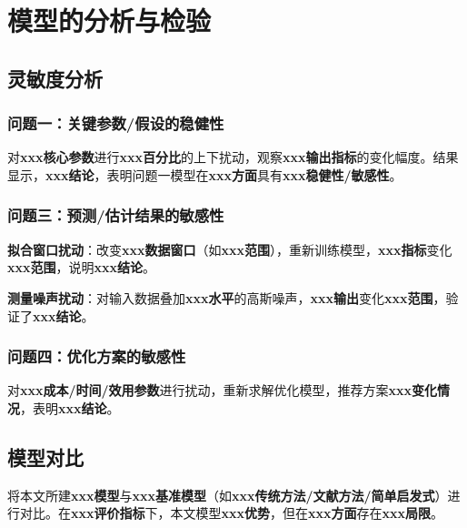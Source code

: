 \documentclass[draft,12pt,a4paper]{ctexart}
\theoremstyle{definition}
\begin{document}
\section{模型的分析与检验}
\subsection{灵敏度分析}

\subsubsection{问题一：关键参数/假设的稳健性}
对\textbf{xxx核心参数}进行\textbf{xxx百分比}的上下扰动，观察\textbf{xxx输出指标}的变化幅度。结果显示，\textbf{xxx结论}，表明问题一模型在\textbf{xxx方面}具有\textbf{xxx稳健性/敏感性}。

\subsubsection{问题三：预测/估计结果的敏感性}
\textbf{拟合窗口扰动}：改变\textbf{xxx数据窗口}（如\textbf{xxx范围}），重新训练模型，\textbf{xxx指标}变化\textbf{xxx范围}，说明\textbf{xxx结论}。

\textbf{测量噪声扰动}：对输入数据叠加\textbf{xxx水平}的高斯噪声，\textbf{xxx输出}变化\textbf{xxx范围}，验证了\textbf{xxx结论}。

\subsubsection{问题四：优化方案的敏感性}
对\textbf{xxx成本/时间/效用参数}进行扰动，重新求解优化模型，推荐方案\textbf{xxx变化情况}，表明\textbf{xxx结论}。

\subsection{模型对比}
将本文所建\textbf{xxx模型}与\textbf{xxx基准模型}（如\textbf{xxx传统方法/文献方法/简单启发式}）进行对比。在\textbf{xxx评价指标}下，本文模型\textbf{xxx优势}，但在\textbf{xxx方面}存在\textbf{xxx局限}。

\end{document}
